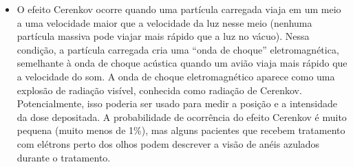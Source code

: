 \documentclass[11pt,a4paper]{article}
\newcounter{exemplo}
\begin{document}
\begin{exemplo}
\begin{itemize}
        \item O efeito Cerenkov ocorre quando uma partícula carregada viaja em um meio a uma velocidade maior que a velocidade da luz nesse meio (nenhuma partícula massiva pode viajar mais rápido que a luz no vácuo). Nessa condição, a partícula carregada cria uma “onda de choque” eletromagnética, semelhante à onda de choque acústica quando um avião viaja mais rápido que a velocidade do som. A onda de choque eletromagnético aparece como uma explosão de radiação visível, conhecida como radiação de Cerenkov. Potencialmente, isso poderia ser usado para medir a posição e a intensidade da dose depositada. A probabilidade de ocorrência do efeito Cerenkov é muito pequena (muito menos de 1\%), mas alguns pacientes que recebem tratamento com elétrons perto dos olhos podem descrever a visão de anéis azulados durante o tratamento.
        
    \end{itemize}
\end{exemplo}
\end{document}
